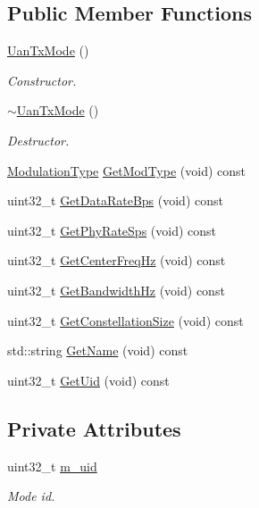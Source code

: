 \subsection*{Public Member Functions}
\begin{DoxyCompactItemize}
\item 
\hyperlink{classns3_1_1UanTxMode_ae1c61bc48ad100cea7f811b5eef471ac}{Uan\+Tx\+Mode} ()
\begin{DoxyCompactList}\small\item\em Constructor. \end{DoxyCompactList}\item 
\hyperlink{classns3_1_1UanTxMode_a9fd149e9a29f389da71ebe227e02c717}{$\sim$\+Uan\+Tx\+Mode} ()
\begin{DoxyCompactList}\small\item\em Destructor. \end{DoxyCompactList}\item 
\hyperlink{classns3_1_1UanTxMode_a0e822d222c13aa9499c96d9b3ad21223}{Modulation\+Type} \hyperlink{classns3_1_1UanTxMode_ab6e4cc9a845e04c8ae2dc66911619c07}{Get\+Mod\+Type} (void) const 
\item 
uint32\+\_\+t \hyperlink{classns3_1_1UanTxMode_a4c6f412d81fc488d228a2cccbddc15b6}{Get\+Data\+Rate\+Bps} (void) const 
\item 
uint32\+\_\+t \hyperlink{classns3_1_1UanTxMode_aa831871a3990e6fc3aad0e62883e959c}{Get\+Phy\+Rate\+Sps} (void) const 
\item 
uint32\+\_\+t \hyperlink{classns3_1_1UanTxMode_ad09294e9d6ddc7beb93265824f69e159}{Get\+Center\+Freq\+Hz} (void) const 
\item 
uint32\+\_\+t \hyperlink{classns3_1_1UanTxMode_a6e50d9c2db47308fe73318bb960451f4}{Get\+Bandwidth\+Hz} (void) const 
\item 
uint32\+\_\+t \hyperlink{classns3_1_1UanTxMode_a21f85a8a0d2efda7333057792c788e47}{Get\+Constellation\+Size} (void) const 
\item 
std\+::string \hyperlink{classns3_1_1UanTxMode_a3b1830fcb3bb3697ffc65b6f742d01be}{Get\+Name} (void) const 
\item 
uint32\+\_\+t \hyperlink{classns3_1_1UanTxMode_a69828d342ba8ba98956d13f864d3d9b8}{Get\+Uid} (void) const 
\end{DoxyCompactItemize}
\subsection*{Private Attributes}
\begin{DoxyCompactItemize}
\item 
uint32\+\_\+t \hyperlink{classns3_1_1UanTxMode_ae2cb9903f367a8fe6bed9d534c9f0147}{m\+\_\+uid}
\begin{DoxyCompactList}\small\item\em Mode id. \end{DoxyCompactList}\end{DoxyCompactItemize}
